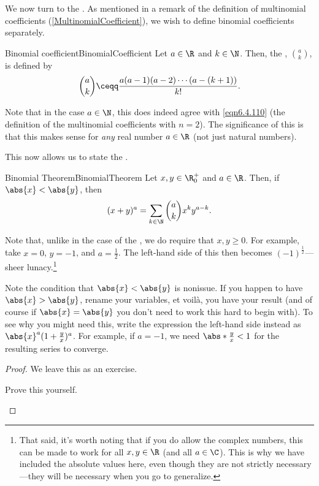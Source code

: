 We now turn to the .  As mentioned in a remark of the definition of multinomial coefficients (\cref{MultinomialCoefficient}), we wish to define binomial coefficients separately.
\begin{dfn}{Binomial coefficient}{BinomialCoefficient}
Let $a\in \R$ and $k\in \N$.  Then, the , $\binom{a}{k}$, is defined by
\begin{equation}
\binom{a}{k}\ceqq \frac{a(a-1)(a-2)\cdots (a-(k+1))}{k!}.
\end{equation}
\begin{rmk}
Note that in the case $a\in \N$, this does indeed agree with \eqref{eqn6.4.110} (the definition of the multinomial coefficients with $n=2$).  The significance of this is that this makes sense for \emph{any} real number $a\in \R$ (not just natural numbers).
\end{rmk}
\end{dfn}
This now allows us to state the .
\begin{thm}{Binomial Theorem}{BinomialTheorem}
Let $x,y\in \R _0^+$ and $a\in \R$.  Then, if $\abs{x}<\abs{y}$, then
\begin{equation}
(x+y)^a=\sum _{k\in \N}\binom{a}{k}x^ky^{a-k}.
\end{equation}
\begin{rmk}
Note that, unlike in the case of the , we do require that $x,y\geq 0$.  For example, take $x=0$, $y=-1$, and $a=\frac{1}{2}$.  The left-hand side of this then becomes $(-1)^{\tfrac{1}{2}}$---sheer lunacy.\footnote{That said, it's worth noting that if you do allow the complex numbers, this can be made to work for all $x,y\in \R$ (and all $a\in \C$).  This is why we have included the absolute values here, even though they are not strictly necessary---they will be necessary when you go to generalize.}
\end{rmk}
\begin{rmk}
Note the condition that $\abs{x}<\abs{y}$ is nonissue.  If you happen to have $\abs{x}>\abs{y}$, rename your variables, et voil\`{a}, you have your result (and of course if $\abs{x}=\abs{y}$ you don't need to work this hard to begin with).  To see why you might need this, write the expression the left-hand side instead as $\abs{x}^a(1+\frac{y}{x})^a$.  For example, if $a=-1$, we need $\abs*{\frac{y}{x}}<1$ for the resulting series to converge.
\end{rmk}
\begin{proof}
We leave this as an exercise.
\begin{exr}[breakable=false]{}{}
Prove this yourself.
\end{exr}
\end{proof}
\end{thm}

